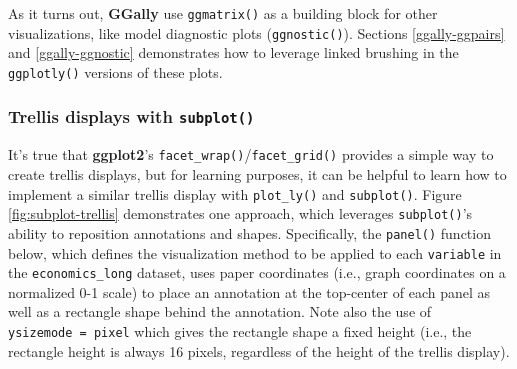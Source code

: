\documentclass[
  12pt,
]{krantz}
\begin{document}
As it turns out, \textbf{GGally} use \texttt{ggmatrix()} as a building block for other visualizations, like model diagnostic plots (\texttt{ggnostic()}). Sections \ref{ggally-ggpairs} and \ref{ggally-ggnostic} demonstrates how to leverage linked brushing in the \texttt{ggplotly()} versions of these plots.

\hypertarget{trellis-displays-subplot}{%
\subsubsection{\texorpdfstring{Trellis displays with \texttt{subplot()}}{Trellis displays with subplot()}}\label{trellis-displays-subplot}}


It's true that \textbf{ggplot2}'s \texttt{facet\_wrap()}/\texttt{facet\_grid()} provides a simple way to create trellis displays, but for learning purposes, it can be helpful to learn how to implement a similar trellis display with \texttt{plot\_ly()} and \texttt{subplot()}. Figure \ref{fig:subplot-trellis} demonstrates one approach, which leverages \texttt{subplot()}'s ability to reposition annotations and shapes. Specifically, the \texttt{panel()} function below, which defines the visualization method to be applied to each \texttt{variable} in the \texttt{economics\_long} dataset, uses paper coordinates (i.e., graph coordinates on a normalized 0-1 scale) to place an annotation at the top-center of each panel as well as a rectangle shape behind the annotation. Note also the use of \texttt{ysizemode\ =\ \textquotesingle{}pixel\textquotesingle{}} which gives the rectangle shape a fixed height (i.e., the rectangle height is always 16 pixels, regardless of the height of the trellis display).

\end{document}

